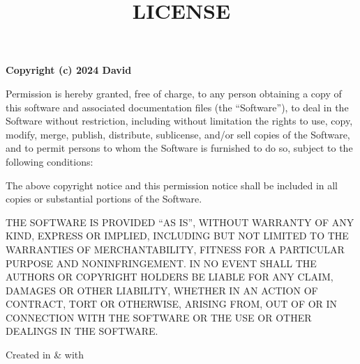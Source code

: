 \documentclass[a4paper,12pt]{article}
\title{\textbf{LICENSE}}
\author{}
\date{}
\begin{document}
\maketitle

\noindent\textbf{Copyright (c) 2024 David}

\bigskip

\noindent Permission is hereby granted, free of charge, to any person obtaining a copy
of this software and associated documentation files (the ``Software''), to deal
in the Software without restriction, including without limitation the rights
to use, copy, modify, merge, publish, distribute, sublicense, and/or sell
copies of the Software, and to permit persons to whom the Software is
furnished to do so, subject to the following conditions:

\medskip

\noindent The above copyright notice and this permission notice shall be included in all
copies or substantial portions of the Software.

\medskip

\noindent THE SOFTWARE IS PROVIDED ``AS IS'', WITHOUT WARRANTY OF ANY KIND, EXPRESS OR
IMPLIED, INCLUDING BUT NOT LIMITED TO THE WARRANTIES OF MERCHANTABILITY,
FITNESS FOR A PARTICULAR PURPOSE AND NONINFRINGEMENT. IN NO EVENT SHALL THE
AUTHORS OR COPYRIGHT HOLDERS BE LIABLE FOR ANY CLAIM, DAMAGES OR OTHER
LIABILITY, WHETHER IN AN ACTION OF CONTRACT, TORT OR OTHERWISE, ARISING FROM,
OUT OF OR IN CONNECTION WITH THE SOFTWARE OR THE USE OR OTHER DEALINGS IN THE
SOFTWARE.

\vspace*{\fill}

\begin{center}Created in  \& 
	with \end{center}
\end{document}
